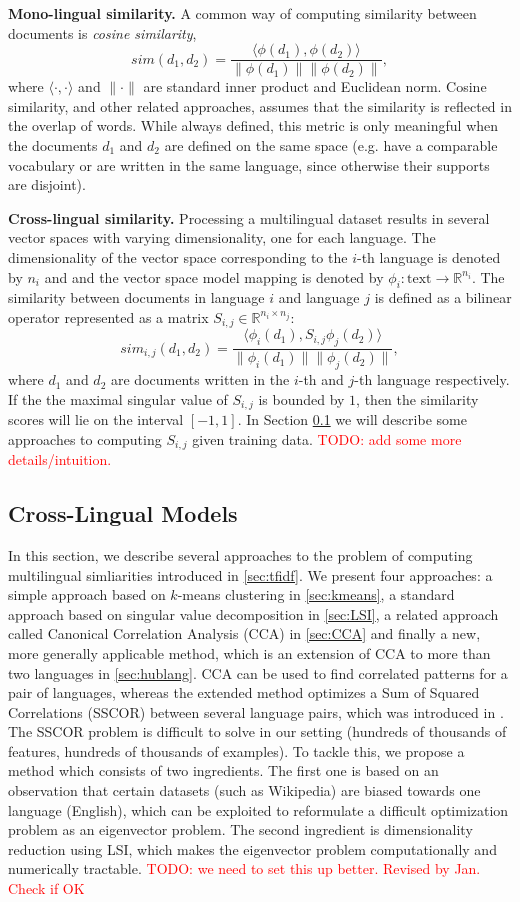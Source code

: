 \documentclass[twoside,11pt]{article}
\newcommand{\todo}[1]{\textcolor{red}{TODO: #1}}
\newcommand{\RR}{\mathbb{R}}
\begin{document}
\noindent\textbf {Mono-lingual similarity.}
A common way of computing similarity between documents is \emph{cosine similarity},
$$sim(d_1, d_2) = \frac{\langle \phi(d_1), \phi(d_2)\rangle}{\|\phi(d_1)\| \|\phi(d_2)\|},$$
where $\langle \cdot,\cdot \rangle$ and $\|\cdot\|$ are standard inner product and Euclidean norm. Cosine similarity, and other related approaches, assumes that the similarity is reflected in the overlap of words. While always defined, this metric is only meaningful when the documents $d_1$ and $d_2$ are defined on the same space (e.g. have a comparable vocabulary or are written in the same language, since otherwise their supports are disjoint).

\noindent\textbf {Cross-lingual similarity.}
Processing a multilingual dataset results in several vector spaces with varying dimensionality, one for each language. The dimensionality of the vector space corresponding to the $i$-th language is denoted by $n_i$ and and the vector space model mapping is denoted by $\phi_i : \text{text} \rightarrow \RR^{n_i}$.
The similarity between documents in language $i$ and language $j$ is defined as a bilinear operator represented as a matrix $S_{i,j} \in \RR^{n_i \times n_j}$:
$$sim_{i,j}(d_1, d_2) = \frac{ \langle \phi_i (d_1), S_{i,j} \phi_j (d_2) \rangle }{\|\phi_i(d_1)\| \|\phi_j(d_2)\|},$$
where $d_1$ and $d_2$ are documents written in the $i$-th and $j$-th language respectively. If the the maximal singular value of $S_{i,j}$ is bounded by $1$, then the similarity scores will lie on the interval $[-1, 1]$. In Section \ref{sec:models} we will describe some approaches to computing $S_{i,j}$ given training data. \todo{add some more details/intuition.}

\subsection{Cross-Lingual Models}\label{sec:models}
In this section, we describe several approaches to the problem of computing multilingual simliarities introduced in \ref{sec:tfidf}. We present four approaches:
a simple approach based on $k$-means clustering in \ref{sec:kmeans}, a standard approach based on singular value decomposition in \ref{sec:LSI}, a related
approach called Canonical Correlation Analysis (CCA) in \ref{sec:CCA} and finally a new, more generally applicable method, which is an extension of CCA to more than two languages in \ref{sec:hublang}.
%
CCA can be used to find correlated patterns for a pair of languages, whereas the extended method optimizes a
Sum of Squared Correlations (SSCOR) between several language pairs, which was introduced in \cite{Kettenring}. The SSCOR problem is difficult to solve in our setting (hundreds of thousands of features, hundreds of thousands of examples). To tackle this, we propose a method which consists of two ingredients.
 The first one is based on an observation that certain datasets (such as Wikipedia) are biased towards one language (English), which can be exploited
 to reformulate a difficult optimization problem as an eigenvector problem. The second ingredient is dimensionality reduction using LSI, which
 makes the eigenvector problem computationally and numerically tractable. \todo{we need to set this up better. Revised by Jan. Check if OK}
\end{document}
